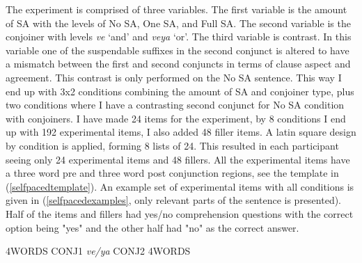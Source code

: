 The experiment is comprised of three variables. The first variable is the amount of SA with the levels of No SA, One SA, and Full SA. The second variable is the conjoiner with levels \textit{ve} `and' and \textit{veya} `or'. The third variable is contrast. In this variable one of the suspendable suffixes in the second conjunct is altered to have a mismatch between the first and second conjuncts in terms of clause aspect and agreement. This contrast is only performed on the No SA sentence. This way I end up with 3x2 conditions combining the amount of SA and conjoiner type, plus two conditions where I have a contrasting second conjunct for No SA condition with conjoiners. I have made 24 items for the experiment, by 8 conditions I end up with 192 experimental items, I also added 48 filler items. A latin square design by condition is applied, forming 8 lists of 24. This resulted in each participant seeing only 24 experimental items and 48 fillers. All the experimental items have a three word pre and three word post conjunction regions, see the template in (\ref{selfpacedtemplate}). An example set of experimental items with all conditions is given in (\ref{selfpacedexamples}, only relevant parts of the sentence is presented). Half of the items and fillers had yes/no comprehension questions with the correct option being "yes" and the other half had "no" as the correct answer.
\begin{exe}
\ex \label{selfpacedtemplate}
4WORDS CONJ1 \textit{ve/ya} CONJ2 4WORDS
\end{exe}


